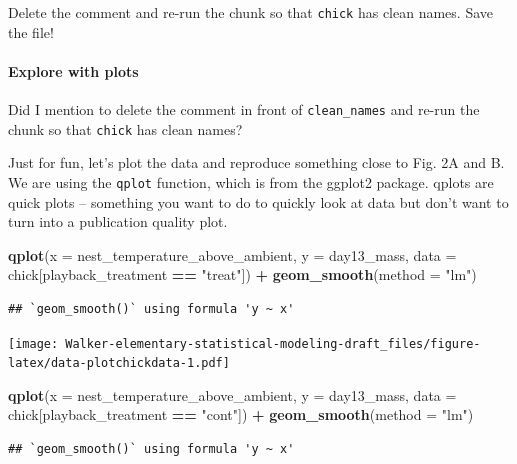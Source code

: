 \documentclass[]{book}
\newenvironment{Shaded}{\begin{snugshade}}{\end{snugshade}}
\newcommand{\DataTypeTok}[1]{\textcolor[rgb]{0.13,0.29,0.53}{#1}}
\newcommand{\KeywordTok}[1]{\textcolor[rgb]{0.13,0.29,0.53}{\textbf{#1}}}
\newcommand{\NormalTok}[1]{#1}
\newcommand{\OperatorTok}[1]{\textcolor[rgb]{0.81,0.36,0.00}{\textbf{#1}}}
\newcommand{\StringTok}[1]{\textcolor[rgb]{0.31,0.60,0.02}{#1}}
\let\oldparagraph\paragraph
\renewcommand{\paragraph}[1]{\oldparagraph{#1}\mbox{}}
\begin{document}
Delete the comment and re-run the chunk so that \texttt{chick} has clean names. Save the file!

\hypertarget{explore-with-plots}{%
\paragraph{Explore with plots}\label{explore-with-plots}}

Did I mention to delete the comment in front of \texttt{clean\_names} and re-run the chunk so that \texttt{chick} has clean names?

Just for fun, let's plot the data and reproduce something close to Fig. 2A and B. We are using the \texttt{qplot} function, which is from the ggplot2 package. qplots are quick plots -- something you want to do to quickly look at data but don't want to turn into a publication quality plot.

\begin{Shaded}
\begin{Highlighting}[]
\KeywordTok{qplot}\NormalTok{(}\DataTypeTok{x =}\NormalTok{ nest_temperature_above_ambient,}
      \DataTypeTok{y =}\NormalTok{ day13_mass,}
      \DataTypeTok{data =}\NormalTok{ chick[playback_treatment }\OperatorTok{==}\StringTok{ "treat"}\NormalTok{]) }\OperatorTok{+}
\StringTok{  }\KeywordTok{geom_smooth}\NormalTok{(}\DataTypeTok{method =} \StringTok{"lm"}\NormalTok{)}
\end{Highlighting}
\end{Shaded}

\begin{verbatim}
## `geom_smooth()` using formula 'y ~ x'
\end{verbatim}

\texttt{[image: Walker-elementary-statistical-modeling-draft\_files/figure-latex/data-plotchickdata-1.pdf]}

\begin{Shaded}
\begin{Highlighting}[]
\KeywordTok{qplot}\NormalTok{(}\DataTypeTok{x =}\NormalTok{ nest_temperature_above_ambient,}
      \DataTypeTok{y =}\NormalTok{ day13_mass,}
      \DataTypeTok{data =}\NormalTok{ chick[playback_treatment }\OperatorTok{==}\StringTok{ "cont"}\NormalTok{]) }\OperatorTok{+}
\StringTok{  }\KeywordTok{geom_smooth}\NormalTok{(}\DataTypeTok{method =} \StringTok{"lm"}\NormalTok{)}
\end{Highlighting}
\end{Shaded}

\begin{verbatim}
## `geom_smooth()` using formula 'y ~ x'
\end{verbatim}
\end{document}
